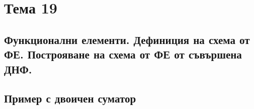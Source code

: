 \section{Тема 19}

\subsection*{Функционални елементи. Дефиниция на схема от ФЕ. Построяване на схема от ФЕ от съвършена ДНФ.} 

\subsection*{Пример с двоичен суматор}

